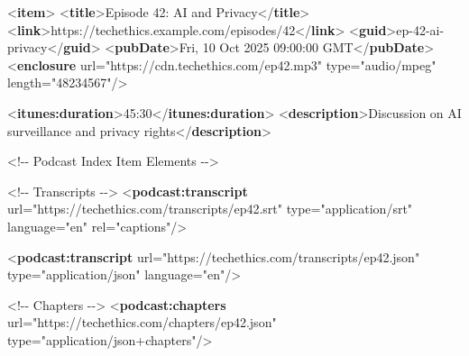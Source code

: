 \documentclass[
  letterpaper,
  DIV=11,
  numbers=noendperiod]{scrartcl}
\newenvironment{Shaded}{\begin{snugshade}}{\end{snugshade}}
\newcommand{\CommentTok}[1]{\textcolor[rgb]{0.37,0.37,0.37}{#1}}
\newcommand{\KeywordTok}[1]{\textcolor[rgb]{0.00,0.23,0.31}{\textbf{#1}}}
\newcommand{\NormalTok}[1]{\textcolor[rgb]{0.00,0.23,0.31}{#1}}
\newcommand{\OtherTok}[1]{\textcolor[rgb]{0.00,0.23,0.31}{#1}}
\newcommand{\StringTok}[1]{\textcolor[rgb]{0.13,0.47,0.30}{#1}}
\begin{document}
\begin{Shaded}
\begin{Highlighting}[]
\NormalTok{    \textless{}}\KeywordTok{item}\NormalTok{\textgreater{}}
\NormalTok{    \textless{}}\KeywordTok{title}\NormalTok{\textgreater{}Episode 42: AI and Privacy\textless{}/}\KeywordTok{title}\NormalTok{\textgreater{}}
\NormalTok{      \textless{}}\KeywordTok{link}\NormalTok{\textgreater{}https://techethics.example.com/episodes/42\textless{}/}\KeywordTok{link}\NormalTok{\textgreater{}}
\NormalTok{      \textless{}}\KeywordTok{guid}\NormalTok{\textgreater{}ep{-}42{-}ai{-}privacy\textless{}/}\KeywordTok{guid}\NormalTok{\textgreater{}}
\NormalTok{      \textless{}}\KeywordTok{pubDate}\NormalTok{\textgreater{}Fri, 10 Oct 2025 09:00:00 GMT\textless{}/}\KeywordTok{pubDate}\NormalTok{\textgreater{}}
\NormalTok{      \textless{}}\KeywordTok{enclosure} 
\OtherTok{          url=}\StringTok{"https://cdn.techethics.com/ep42.mp3"} 
\OtherTok{          type=}\StringTok{"audio/mpeg"} 
\OtherTok{          length=}\StringTok{"48234567"}\NormalTok{/\textgreater{}}
      
\NormalTok{      \textless{}}\KeywordTok{itunes:duration}\NormalTok{\textgreater{}45:30\textless{}/}\KeywordTok{itunes:duration}\NormalTok{\textgreater{}}
\NormalTok{      \textless{}}\KeywordTok{description}\NormalTok{\textgreater{}Discussion on AI surveillance and privacy rights\textless{}/}\KeywordTok{description}\NormalTok{\textgreater{}}
      
   \CommentTok{\textless{}!{-}{-} Podcast Index Item Elements {-}{-}\textgreater{}}
      
      \CommentTok{\textless{}!{-}{-} Transcripts {-}{-}\textgreater{}}
\NormalTok{      \textless{}}\KeywordTok{podcast:transcript} 
\OtherTok{  url=}\StringTok{"https://techethics.com/transcripts/ep42.srt"} 
\OtherTok{      type=}\StringTok{"application/srt"} 
\OtherTok{          language=}\StringTok{"en"} 
\OtherTok{  rel=}\StringTok{"captions"}\NormalTok{/\textgreater{}}
      
\NormalTok{      \textless{}}\KeywordTok{podcast:transcript} 
\OtherTok{          url=}\StringTok{"https://techethics.com/transcripts/ep42.json"} 
\OtherTok{    type=}\StringTok{"application/json"} 
\OtherTok{          language=}\StringTok{"en"}\NormalTok{/\textgreater{}}
      
      \CommentTok{\textless{}!{-}{-} Chapters {-}{-}\textgreater{}}
\NormalTok{      \textless{}}\KeywordTok{podcast:chapters} 
\OtherTok{          url=}\StringTok{"https://techethics.com/chapters/ep42.json"} 
\OtherTok{          type=}\StringTok{"application/json+chapters"}\NormalTok{/\textgreater{}}
      

\end{Highlighting}
\end{Shaded}
\end{document}
